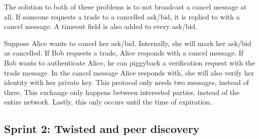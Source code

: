 \documentclass[]{article}
\begin{document}
The solution to both of these problems is to not broadcast a cancel message at all.
If someone requests a trade to a cancelled ask/bid, it is replied to with a cancel message.
A timeout field is also added to every ask/bid.


Suppose Alice wants to cancel her ask/bid.
Internally, she will mark her ask/bid as cancelled.
If Bob requests a trade, Alice responds with a cancel message.
If Bob wants to authenticate Alice, he can piggyback a verification request with the trade message.
In the cancel message Alice responds with, she will also verify her identity with her private key.
This protocol only needs two messages, instead of three.
This exchange only happens between interested parties, instead of the entire network.
Lastly, this only occurs until the time of expiration.

\subsection{Sprint 2: Twisted and peer discovery}

\end{document}
